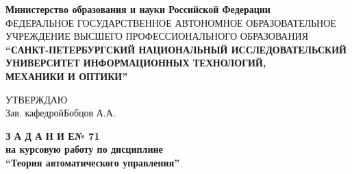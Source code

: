 \documentclass[fleqn, a4paper, 12pt, russian]{article}
\begin{document}
	\centering
	{\fontsize{14pt}{5cm}\selectfont \bfseries Министерство образования и науки Российской Федерации} \\ \vspace{0.5cm}
	{\fontsize{6.8pt}{5cm}\selectfont ФЕДЕРАЛЬНОЕ ГОСУДАРСТВЕННОЕ АВТОНОМНОЕ ОБРАЗОВАТЕЛЬНОЕ УЧРЕЖДЕНИЕ ВЫСШЕГО ПРОФЕССИОНАЛЬНОГО ОБРАЗОВАНИЯ} \\ 
	\vspace{0.5cm}
	{\fontsize{13pt}{5cm}\selectfont \bfseries “САНКТ-ПЕТЕРБУРГСКИЙ НАЦИОНАЛЬНЫЙ ИССЛЕДОВАТЕЛЬСКИЙ УНИВЕРСИТЕТ ИНФОРМАЦИОННЫХ ТЕХНОЛОГИЙ,} \\ \vspace{0.1cm}
	{\fontsize{13pt}{5cm}\selectfont \bfseries МЕХАНИКИ И ОПТИКИ”} \\ \vspace{1cm}
	
	\flushleft
	{\fontsize{12pt}{0cm} \hspace{1.6cm}УТВЕРЖДАЮ} \\ \vspace{0.1cm}
	{\fontsize{12pt}{0cm}\selectfont \hspace{10.5cm}Зав. кафедрой\hspace{0.6cm}Бобцов А.А.} \\ \vspace{1cm}
	
	\centering
	{\fontsize{18pt}{0cm}\selectfont \bfseries З А Д А Н И Е\hspace{0.2cm}№ 71}\\ \vspace{0.2cm}
	{\fontsize{16pt}{0cm}\selectfont \bfseries на курсовую работу по дисциплине}	\\ \vspace{0.2cm}
	{\fontsize{16pt}{0cm}\selectfont \bfseries \enquote{Теория автоматического управления}} \\ \vspace{1cm}
	
\end{document}
